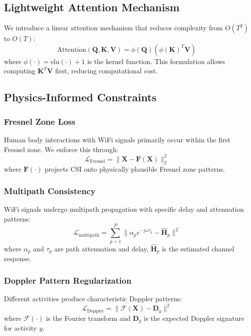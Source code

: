 \documentclass[10pt,conference]{IEEEtran}
\begin{document}
\subsection{Lightweight Attention Mechanism}

We introduce a linear attention mechanism that reduces complexity from $O(T^2)$ to $O(T)$:
\begin{equation}
    \text{Attention}(\mathbf{Q}, \mathbf{K}, \mathbf{V}) = \phi(\mathbf{Q})(\phi(\mathbf{K})^T\mathbf{V})
\end{equation}
where $\phi(\cdot) = \text{elu}(\cdot) + 1$ is the kernel function. This formulation allows computing $\mathbf{K}^T\mathbf{V}$ first, reducing computational cost.

\subsection{Physics-Informed Constraints}

\subsubsection{Fresnel Zone Loss}
Human body interactions with WiFi signals primarily occur within the first Fresnel zone. We enforce this through:
\begin{equation}
    \mathcal{L}_{\text{Fresnel}} = \|\mathbf{X} - \mathbf{F}(\mathbf{X})\|_2^2
\end{equation}
where $\mathbf{F}(\cdot)$ projects CSI onto physically plausible Fresnel zone patterns.

\subsubsection{Multipath Consistency}
WiFi signals undergo multipath propagation with specific delay and attenuation patterns:
\begin{equation}
    \mathcal{L}_{\text{multipath}} = \sum_{p=1}^P \|\alpha_p e^{-j\omega\tau_p} - \hat{\mathbf{H}}_p\|^2
\end{equation}
where $\alpha_p$ and $\tau_p$ are path attenuation and delay, $\hat{\mathbf{H}}_p$ is the estimated channel response.

\subsubsection{Doppler Pattern Regularization}
Different activities produce characteristic Doppler patterns:
\begin{equation}
    \mathcal{L}_{\text{Doppler}} = \|\mathcal{F}(\mathbf{X}) - \mathbf{D}_y\|^2
\end{equation}
where $\mathcal{F}(\cdot)$ is the Fourier transform and $\mathbf{D}_y$ is the expected Doppler signature for activity $y$.
\end{document}
